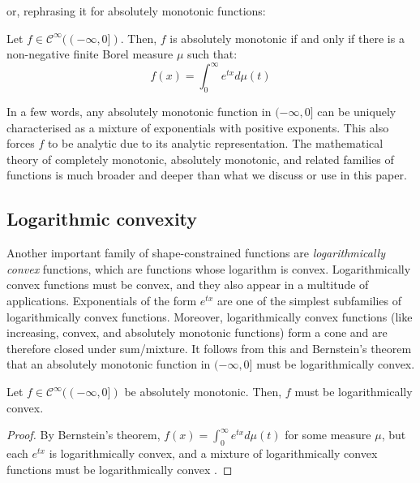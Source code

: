\documentclass[12pt,a4paper]{article}
\newcommand{\cinfty} {\mathcal{C}^{\infty}}
\begin{document}
\noindent or, rephrasing it for absolutely monotonic functions:

\begin{theorem}
Let $f \in \cinfty((-\infty,0])$.
Then, $f$ is absolutely monotonic if and only if there is a non-negative finite Borel measure $\mu$ such that:
\begin{equation}
f(x) = \int_0^{\infty} e^{tx}d\mu(t)
\end{equation}
\end{theorem}

In a few words, any absolutely monotonic function in $(-\infty,0]$ can be uniquely characterised as a mixture of exponentials with positive exponents. This also forces $f$ to be analytic due to its analytic representation. The mathematical theory of completely monotonic, absolutely monotonic, and related families of functions is much broader and deeper than what we discuss or use in this paper\cite{2014_koumandos_completely_monotonic}.\\

\subsection{Logarithmic convexity}

Another important family of shape-constrained functions are {\emph{logarithmically convex}} functions, which are functions whose logarithm is convex. Logarithmically convex functions must be convex, and they also appear in a multitude of applications. Exponentials of the form $e^{tx}$ are one of the simplest subfamilies of logarithmically convex functions. Moreover, logarithmically convex functions (like increasing, convex, and absolutely monotonic functions) form a cone and are therefore closed under sum/mixture. It follows from this and Bernstein's theorem that an absolutely monotonic function in $(-\infty,0]$ must be logarithmically convex.

\begin{lemma}
Let $f \in \cinfty((-\infty,0])$ be absolutely monotonic.
Then, $f$ must be logarithmically convex.
\end{lemma}

\begin{proof}
By Bernstein's theorem, $f(x) = \int_0^{\infty} e^{tx} d\mu(t)$ for some measure $\mu$, but each $e^{tx}$ is logarithmically convex, and a mixture of logarithmically convex functions must be logarithmically convex \cite{2004_boyd_convex_optimization}. 
\end{proof}
\end{document}
